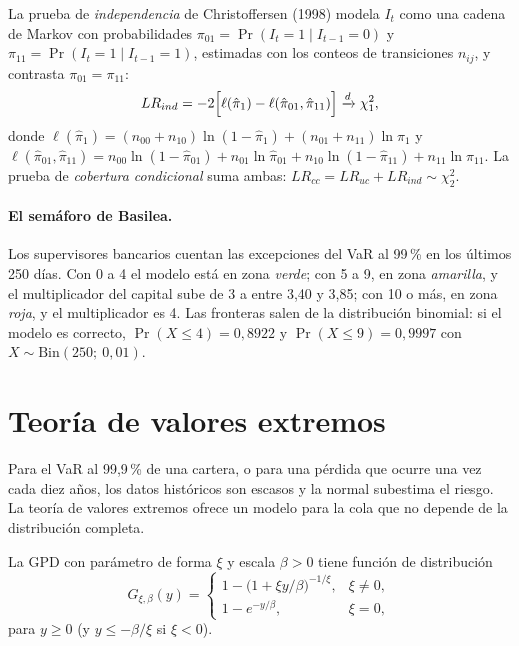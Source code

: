 La prueba de \emph{independencia} de Christoffersen (1998) modela $I_t$ como una cadena de Markov con
probabilidades $\pi_{01}=\Pr(I_t=1\mid I_{t-1}=0)$ y $\pi_{11}=\Pr(I_t=1\mid I_{t-1}=1)$, estimadas con los conteos
de transiciones $n_{ij}$, y contrasta $\pi_{01}=\pi_{11}$:
\[
  LR_{ind}=-2\Bigl[\ell(\hat\pi_1)-\ell(\hat\pi_{01},\hat\pi_{11})\Bigr]\xrightarrow{d}\chi^2_1,
\]
donde $\ell(\hat\pi_1)=(n_{00}+n_{10})\ln(1-\hat\pi_1)+(n_{01}+n_{11})\ln\hat\pi_1$ y
$\ell(\hat\pi_{01},\hat\pi_{11})=n_{00}\ln(1-\hat\pi_{01})+n_{01}\ln\hat\pi_{01}+n_{10}\ln(1-\hat\pi_{11})+n_{11}\ln\hat\pi_{11}$.
La prueba de \emph{cobertura condicional} suma ambas: $LR_{cc}=LR_{uc}+LR_{ind}\sim\chi^2_2$.

\paragraph{El semáforo de Basilea.} Los supervisores bancarios cuentan las excepciones del VaR al 99\,\% en los últimos
250 días. Con 0 a 4 el modelo está en zona \emph{verde}; con 5 a 9, en zona \emph{amarilla}, y el multiplicador del
capital sube de 3 a entre 3,40 y 3,85; con 10 o más, en zona \emph{roja}, y el multiplicador es 4. Las fronteras
salen de la distribución binomial: si el modelo es correcto, $\Pr(X\le4)=0{,}8922$ y $\Pr(X\le9)=0{,}9997$ con
$X\sim\mathrm{Bin}(250;\ 0{,}01)$.

\section{Teoría de valores extremos}

Para el VaR al 99,9\,\% de una cartera, o para una pérdida que ocurre una vez cada diez años, los datos históricos
son escasos y la normal subestima el riesgo. La teoría de valores extremos ofrece un modelo para la cola que no
depende de la distribución completa.

\begin{definicion}
La GPD con parámetro de forma $\xi$ y escala $\beta>0$ tiene función de distribución
\[
  G_{\xi,\beta}(y)=\begin{cases}
     1-\bigl(1+\xi y/\beta\bigr)^{-1/\xi}, & \xi\ne0,\\[2pt]
     1-e^{-y/\beta}, & \xi=0,
  \end{cases}
\]
para $y\ge0$ (y $y\le-\beta/\xi$ si $\xi<0$).
\end{definicion}

